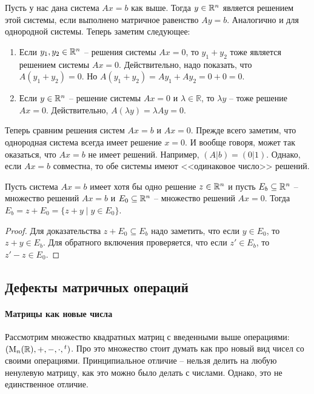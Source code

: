 Пусть у нас дана система $Ax = b$ как выше.
Тогда $y\in\mathbb R^{n}$ является решением этой системы, если выполнено матричное равенство $Ay = b$.
Аналогично и для однородной системы.
Теперь заметим следующее:
\begin{enumerate}
\item Если $y_1, y_2\in \mathbb R^{n}$ -- решения системы $Ax = 0$, то $y_1 + y_2$ тоже является решением системы $Ax = 0$.
Действительно, надо показать, что $A(y_1 + y_2) = 0$.
Но $A(y_1 + y_2) = A y_1 + Ay_2 = 0 + 0 = 0$.

\item Если $y\in\mathbb R^{n}$ -- решение системы $Ax = 0$ и $\lambda\in \mathbb R$, то $\lambda y$ -- тоже решение $Ax = 0$.
Действительно, $A(\lambda y) = \lambda Ay = 0$.
\end{enumerate}

Теперь сравним решения систем $Ax = b$ и $Ax = 0$.
Прежде всего заметим, что однородная система всегда имеет решение $x = 0$.
И вообще говоря, может так оказаться, что $Ax = b$ не имеет решений.
Например, $(A|b) = (0|1)$.
Однако, если $Ax = b$ совместна, то обе системы имеют <<одинаковое число>> решений.

\begin{claim*}
Пусть система $Ax = b$ имеет хотя бы одно решение $z\in\mathbb R^{n}$ и пусть $E_b\subseteq \mathbb R^{n}$ -- множество решений $Ax = b$ и $E_0\subseteq \mathbb R^{n}$ -- множество решений $Ax = 0$.
Тогда $E_b = z + E_0 = \{z +y\mid y\in E_0\}$.
\end{claim*}
\begin{proof}
Для доказательства $z + E_0 \subseteq E_b$ надо заметить, что если $y\in E_0$, то $z+y\in E_b$.
Для обратного включения проверяется, что если $z'\in E_b$, то $z' - z\in E_0$.
\end{proof}

\subsection{Дефекты матричных операций}

\paragraph{Матрицы как новые числа}

Рассмотрим множество квадратных матриц с введенными выше операциями: $(\operatorname{M}_{n}(\mathbb R), +, -, \cdot, {}^t)$.
Про это множество стоит думать как про новый вид чисел со своими операциями.
Принципиальное отличие -- нельзя делить на любую ненулевую матрицу, как это можно было делать с числами.
Однако, это не единственное отличие.

